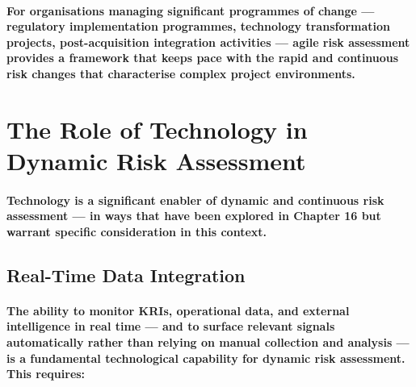 \paragraph{For organisations managing significant programmes of change — regulatory implementation programmes, technology transformation projects, post-acquisition integration activities — agile risk assessment provides a framework that keeps pace with the rapid and continuous risk changes that characterise complex project environments.}

\section{The Role of Technology in Dynamic Risk Assessment}
\paragraph{Technology is a significant enabler of dynamic and continuous risk assessment — in ways that have been explored in Chapter 16 but warrant specific consideration in this context.}

\subsection{Real-Time Data Integration}
\paragraph{The ability to monitor KRIs, operational data, and external intelligence in real time — and to surface relevant signals automatically rather than relying on manual collection and analysis — is a fundamental technological capability for dynamic risk assessment. This requires:}
\begin{itemize}
\end{itemize}

